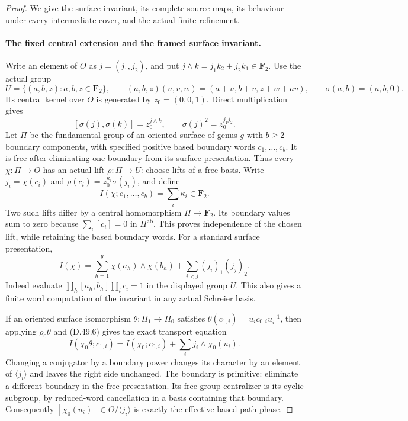 \begin{proof}
We give the surface invariant, its complete source maps, its behaviour
under every intermediate cover, and the actual finite refinement.

\paragraph{The fixed central extension and the framed surface invariant.}
Write an element of \(O\) as \(j=(j_1,j_2)\), and put
\(j\wedge k=j_1k_2+j_2k_1\in\mathbf F_2\).
Use the actual group
\[
 U=\{(a,b,z):a,b,z\in\mathbf F_2\},\qquad
 (a,b,z)(u,v,w)=(a+u,b+v,z+w+av),
 \qquad \sigma(a,b)=(a,b,0).
 \tag{D.49.5}
\]
Its central kernel over \(O\) is generated by \(z_0=(0,0,1)\).
Direct multiplication gives
\[
 [\sigma(j),\sigma(k)]=z_0^{j\wedge k},\qquad
 \sigma(j)^2=z_0^{j_1j_2}.
 \tag{D.49.6}
\]
Let \(\Pi\) be the fundamental group of an oriented surface of genus
\(g\) with \(b\geq2\) boundary components, with specified positive
based boundary words \(c_1,\ldots,c_b\). It is free after eliminating
one boundary from its surface presentation. Thus every
\(\chi:\Pi\to O\) has an actual lift \(\rho:\Pi\to U\): choose lifts
of a free basis. Write
\(j_i=\chi(c_i)\) and
\(\rho(c_i)=z_0^{\kappa_i}\sigma(j_i)\), and define
\[
             I(\chi;c_1,\ldots,c_b)=\sum_i\kappa_i\in\mathbf F_2.
 \tag{D.49.7}
\]
Two such lifts differ by a central homomorphism
\(\Pi\to\mathbf F_2\). Its boundary values sum to zero because
\(\sum_i[c_i]=0\) in \(\Pi^{\mathrm{ab}}\). This proves independence
of the chosen lift, while retaining the based boundary words.
For a standard surface presentation,
\[
 I(\chi)=\sum_{h=1}^g\chi(a_h)\wedge\chi(b_h)
               +\sum_{i<j}(j_i)_1(j_j)_2.
 \tag{D.49.8}
\]
Indeed evaluate \(\prod_h[a_h,b_h]\prod_i c_i=1\) in the displayed
group \(U\). This also gives a finite word computation of the invariant
in any actual Schreier basis.

If an oriented surface isomorphism \(\theta:\Pi_1\to\Pi_0\) satisfies
\(\theta(c_{1,i})=u_ic_{0,i}u_i^{-1}\), then applying \(\rho_0\theta\)
and \textup{(D.49.6)} gives the exact transport equation
\[
 I(\chi_0\theta;c_{1,i})
       =I(\chi_0;c_{0,i})+\sum_i j_i\wedge\chi_0(u_i).
 \tag{D.49.9}
\]
Changing a conjugator by a boundary power changes its character by an
element of \(\langle j_i\rangle\) and leaves the right side unchanged.
The boundary is primitive: eliminate a different boundary in the free
presentation. Its free-group centralizer is its cyclic subgroup, by
reduced-word cancellation in a basis containing that boundary.
Consequently \([\chi_0(u_i)]\in O/\langle j_i\rangle\) is exactly
the effective based-path phase.


\end{proof}
